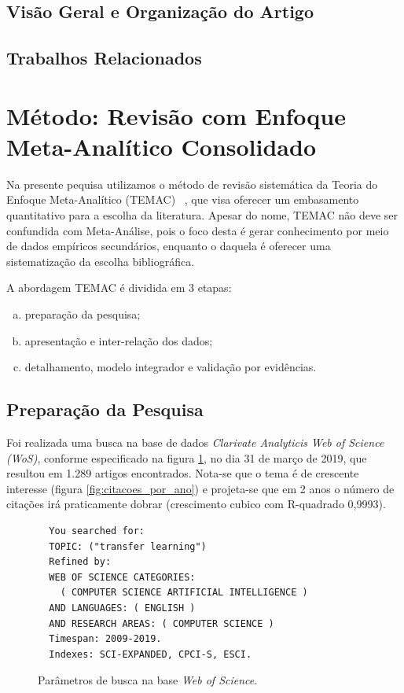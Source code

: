 \documentclass[sigconf]{acmart}
\begin{document}
  \subsection{Visão Geral e Organização do Artigo}
  \lipsum[3]
  \subsection{Trabalhos Relacionados}
  \lipsum[2]
\section{Método: Revisão com Enfoque Meta-Analítico Consolidado}\label{TEMAC}
Na presente pequisa utilizamos o método de revisão sistemática da Teoria do Enfoque Meta-Analítico (TEMAC) ~\cite{Mariano}, que visa oferecer um embasamento quantitativo para a escolha da literatura. Apesar do nome, TEMAC não deve ser confundida com Meta-Análise, pois o foco desta é gerar conhecimento por meio de dados empíricos secundários, enquanto o daquela é oferecer uma sistematização da escolha bibliográfica.

A abordagem TEMAC é dividida em 3 etapas: 
\begin{enumerate}[a)]
  \item preparação da pesquisa;
  \item apresentação e inter-relação dos dados;
  \item detalhamento, modelo integrador e validação por evidências.
\end{enumerate}

\subsection{Preparação da Pesquisa}
Foi realizada uma busca na base de dados \emph{Clarivate Analyticis Web of Science (WoS)}, conforme especificado na figura \ref{card:wos}, no dia 31 de março de 2019, que resultou em 1.289 artigos encontrados. Nota-se que o tema é de crescente interesse (figura \ref{fig:citacoes_por_ano}) e projeta-se que em 2 anos o número de citações irá praticamente dobrar (crescimento cubico com R-quadrado 0,9993).
\begin{figure}[htp]

\begin{tcolorbox}[colback=yellow!5!white,colframe=gray!75!black,title={Results: 1,289 (from Web of Science Core Collection)}]
  \begin{verbatim}
  You searched for: 
  TOPIC: ("transfer learning")
  Refined by: 
  WEB OF SCIENCE CATEGORIES: 
    ( COMPUTER SCIENCE ARTIFICIAL INTELLIGENCE )
  AND LANGUAGES: ( ENGLISH ) 
  AND RESEARCH AREAS: ( COMPUTER SCIENCE )
  Timespan: 2009-2019. 
  Indexes: SCI-EXPANDED, CPCI-S, ESCI.
  \end{verbatim}

\end{tcolorbox}
\caption{Parâmetros de busca na base \emph{Web of Science}.}
\label{card:wos}
\end{figure}
\end{document}
